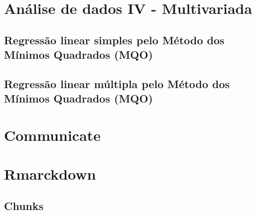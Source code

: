 \documentclass[a4paper,12pt]{article}
\begin{document}
\section*{Análise de dados IV - Multivariada}
\subsection*{Regressão linear simples pelo Método dos Mínimos Quadrados (MQO)}
\subsection*{Regressão linear múltipla pelo Método dos Mínimos Quadrados (MQO)}

\section{Communicate}
\section*{Rmarckdown}
\subsection*{Chunks}
\end{document}
